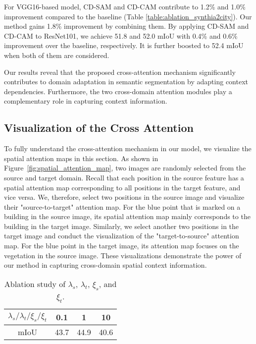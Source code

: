 \documentclass[10pt,twocolumn,letterpaper]{article}
\begin{document}
	For VGG16-based model, CD-SAM and CD-CAM contribute to 1.2\% and 1.0\% improvement compared to the baseline (Table \ref{table:ablation_synthia2city}). Our method gains 1.8\% improvement by combining them. By applying CD-SAM and CD-CAM to ResNet101, we achieve 51.8 and 52.0 mIoU with 0.4\% and 0.6\% improvement over the baseline, respectively. It is further boosted to 52.4 mIoU when both of them are considered.

	Our results reveal that the proposed cross-attention mechanism significantly contributes to domain adaptation in semantic segmentation by adapting context dependencies. Furthermore, the two cross-domain attention modules play a complementary role in capturing context information.

	\subsection{Visualization of the Cross Attention}

	To fully understand the cross-attention mechanism in our model, we visualize the spatial attention maps in this section. As shown in Figure~\ref{fig:spatial_attention_map}, two images are randomly selected from the source and target domain. Recall that each position in the source feature has a spatial attention map corresponding to all positions in the target feature, and vice versa. We, therefore, select two positions in the source image and visualize their "source-to-target" attention map. For the blue point that is marked on a building in the source image, its spatial attention map mainly corresponds to the building in the target image. Similarly, we select another two positions in the target image and conduct the visualization of the "target-to-source" attention map. For the blue point in the target image, its attention map focuses on the vegetation in the source image. These visualizations demonstrate the power of our method in capturing cross-domain spatial context information.

	\begin{table}
		\caption{Ablation study of $ \lambda_{s} $, $ \lambda_{t} $, $ \xi_{s} $, and $ \xi_{t} $.}
		\label{table:ablation_attention}

		\footnotesize
		\setlength\tabcolsep{17pt}
		\begin{center}
			\begin{tabularx}{.45\textwidth}{ cccc @{} }
				\toprule
$ \lambda_{s}/\lambda_{t}/\xi_{s}/\xi_{t} $ & 0.1 & 1 & 10 \\
				\midrule
				mIoU & 43.7 & 44.9 & 40.6 \\
				\bottomrule
			\end{tabularx}
		\end{center}
		\vspace{-0.2in}
	\end{table}
\end{document}
